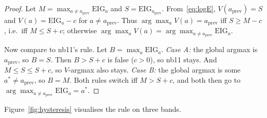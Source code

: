 \documentclass[11pt,a4paper]{article}
\theoremstyle{plain}
\begin{document}
\begin{proof}
Let $M = \max_{a\neq a_{\mathrm{prev}}} \mathrm{EIG}_a$ and
$S = \mathrm{EIG}_{a_{\mathrm{prev}}}$. From~\eqref{eq:logE},
$V(a_{\mathrm{prev}}) = S$ and $V(a) = \mathrm{EIG}_a - c$ for
$a\neq a_{\mathrm{prev}}$. Thus $\arg\max_a V(a) = a_{\mathrm{prev}}$
iff $S \geq M-c$, i.e.\ iff $M \leq S + c$; otherwise
$\arg\max_a V(a) = \arg\max_{a\neq a_{\mathrm{prev}}}\mathrm{EIG}_a$.

Now compare to nb11's rule. Let $B = \max_a \mathrm{EIG}_a$.
\emph{Case A:} the global argmax is $a_{\mathrm{prev}}$, so $B = S$.
Then $B > S + c$ is false ($c > 0$), so nb11 stays. And
$M \leq S \leq S + c$, so $V$-argmax also stays.
\emph{Case B:} the global argmax is some
$a^\ast \neq a_{\mathrm{prev}}$, so $B = M$. Both rules switch iff
$M > S+c$, and both then go to
$\arg\max_{a\neq a_{\mathrm{prev}}}\mathrm{EIG}_a = a^\ast$. \qedhere
\end{proof}

Figure~\ref{fig:hysteresis} visualises the rule on three bands.
\end{document}
